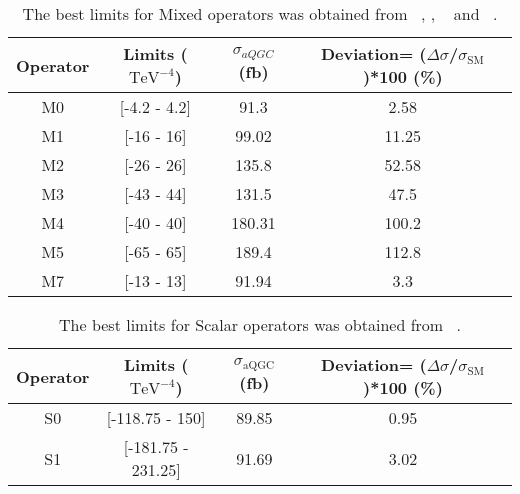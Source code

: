 
\begin{table}
	\centering
	\begin{tabular}{|c|c|c|c|}
		\hline
		Operator & Limits ($\text{TeV}^{-4}$)& $\sigma_{aQGC}$(fb)& Deviation= ($\Delta\sigma$/$\sigma_\text{SM}$)*100 (\%) \\
		\hline \hline
		M0 & [-4.2 - 4.2] & 91.3 & 2.58\\
		\hline
		M1 & [-16 - 16] & 99.02 & 11.25\\
		\hline
		M2 & [-26 - 26] & 135.8 & 52.58 \\
		\hline
		M3 & [-43 - 44] & 131.5 & 47.5\\
		\hline
		M4 & [-40 - 40] & 180.31 & 100.2\\
		\hline
		M5 & [-65 - 65] & 189.4 & 112.8 \\
		\hline
		M7 & [-13 - 13] &91.94 & 3.3\\
		\hline
	\end{tabular}
	\caption{The best limits for Mixed operators was obtained from ~\cite{MixedRef1}, \cite{PhysRevD.90.032008}, ~\cite{PhysRevLett.114.051801} and ~\cite{Khachatryan:2016mud}. \label{table2}}
	\label{MixedOpsTable}
\end{table}


\begin{table}
	\centering
	\begin{tabular}{|c|c|c|c|}
		\hline
		Operator & Limits ($\text{TeV}^{-4}$)& $\sigma_\text{aQGC}$(fb)  & Deviation= ($\Delta\sigma$/$\sigma_\text{SM}$)*100 (\%) \\
		\hline \hline
		S0 & [-118.75 - 150]& 89.85 &  0.95\\
		\hline
		S1 & [-181.75 - 231.25]& 91.69 &  3.02\\
		\hline
	\end{tabular}
	\caption{The best limits for Scalar operators was obtained from ~\cite{ScalarOpRef}\label{table3}. }
\end{table}

